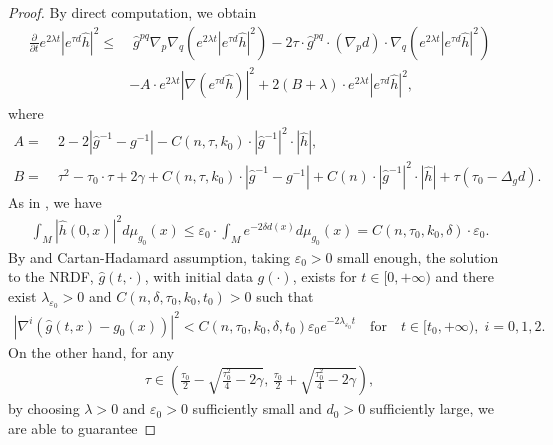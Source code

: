 \documentclass[12pt]{amsart}
\begin{document}
\begin{proof}
    By direct computation, we obtain 
\begin{equation}\label{long time existence without weights formula 2}
    \begin{split}
        \frac{\partial}{\partial t} e^{2\lambda t}|e^{\tau d}\hat{h}|^2 
        \leq&\; \hat{g}^{pq} \nabla_p \nabla_q \left( e^{2\lambda t} |e^{\tau d} \hat{h}|^2 \right) - 2 \tau \cdot \hat{g}^{pq} \cdot (\nabla_p d) \cdot \nabla_q  \left( e^{2\lambda t} |e^{\tau d}\hat{h}|^2 \right)\\
        &- A\cdot e^{2\lambda t}|\nabla (e^{\tau d}\hat{h})|^2 + 2(B + \lambda)\cdot e^{2\lambda t} |e^{\tau d}\hat{h}|^2,
    \end{split}
\end{equation}
where 
\begin{align*}
    A =&\; 2 -2|\hat{g}^{-1} - g^{-1}| - C(n, \tau, k_0)\cdot|\hat{g}^{-1}|^2\cdot |\hat{h}|,\\ 
    B =&\; \tau^2 - \tau_0 \cdot \tau + 2\gamma + C(n, \tau, k_0)\cdot |\hat{g}^{-1} - g^{-1}| + C(n)\cdot |\hat{g}^{-1}|^2 \cdot |\hat{h}| + \tau (\tau_0 - \Delta_g d).
\end{align*}
As in , we have  
\begin{align}
    \int_M |\hat{h}(0, x)|^2 d\mu_{g_0}(x) \leq \varepsilon_0 \cdot \int_M e^{-2\delta d(x)} d\mu_{g_0}(x) = C(n, \tau_0, k_0, \delta)\cdot \varepsilon_0.
\end{align}
By  and Cartan-Hadamard assumption, taking $\varepsilon_0 > 0$ small enough, the solution to the NRDF, $\hat{g}(t, \cdot)$, with initial data $g(\cdot)$, exists for $t\in [0, +\infty)$ and there exist $\lambda_{\varepsilon_0} > 0$ and $C(n, \delta, \tau_0, k_0, t_0) > 0$ such that 
\begin{align}\label{long time eistence with weight formula 1}
    |\nabla^{i}(\hat{g}(t, x) - g_0(x))|^2 < C(n, \tau_0, k_0, \delta, t_0)\varepsilon_0 e^{-2\lambda_{\varepsilon_0} t} \quad \text{for} \quad t\in [t_0, +\infty),\; i = 0, 1, 2. 
\end{align}
 On the other hand, for any
\begin{align}
    \tau \in \left(\frac{\tau_0}{2} - \sqrt{\frac{\tau_0^2}{4} - 2\gamma} ,\, \frac{\tau_0}{2} + \sqrt{\frac{\tau_0^2}{4} - 2\gamma} \right),
\end{align}
by choosing $\lambda > 0$ and $\varepsilon_0 > 0$ sufficiently small and $d_0 > 0$ sufficiently large, we are able to guarantee 

\end{proof}
\end{document}
